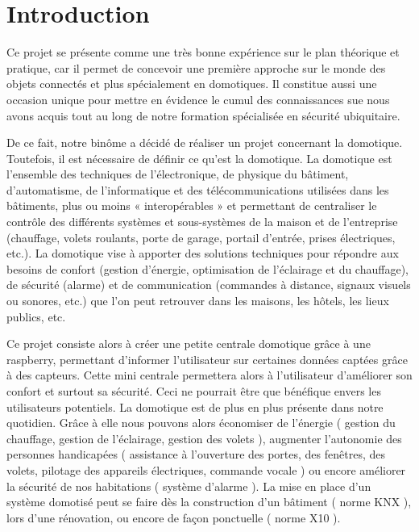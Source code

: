 
\chapter{Introduction}

Ce projet se présente comme une très bonne expérience sur le plan théorique et pratique, car il permet de concevoir une première approche sur le monde des objets connectés et plus spécialement en domotiques. Il constitue aussi une occasion unique pour mettre en évidence le cumul des connaissances sue nous avons acquis tout au long de notre formation spécialisée en sécurité ubiquitaire.


De ce fait, notre binôme a décidé de réaliser un projet concernant la domotique. Toutefois, il est nécessaire de définir ce qu'est la domotique. La domotique est l'ensemble des techniques de l'électronique, de physique du bâtiment, d'automatisme, de l'informatique et des télécommunications utilisées dans les bâtiments, plus ou moins « interopérables » et permettant de centraliser le contrôle des différents systèmes et sous-systèmes de la maison et de l'entreprise (chauffage, volets roulants, porte de garage, 
portail d'entrée, prises électriques, etc.). La domotique vise à apporter des solutions techniques pour répondre aux besoins de 
confort (gestion d'énergie, optimisation de l'éclairage et du chauffage), de sécurité (alarme) et de communication (commandes à 
distance, signaux visuels ou sonores, etc.) que l'on peut retrouver dans les maisons, les hôtels, les lieux publics, etc.


Ce projet consiste alors à créer une petite centrale domotique grâce à une raspberry, permettant d'informer l'utilisateur sur certaines données captées grâce à des capteurs. Cette mini centrale permettera alors à l'utilisateur d'améliorer son confort et surtout sa sécurité. Ceci ne pourrait être que bénéfique envers les utilisateurs potentiels. La domotique est de plus en plus présente dans notre quotidien. Grâce à elle nous pouvons alors économiser de l'énergie ( gestion du chauffage, gestion de l'éclairage, gestion des volets ), augmenter l'autonomie des personnes handicapées ( assistance à l'ouverture des portes, des fenêtres, des volets, pilotage des appareils électriques, commande vocale ) ou encore améliorer la sécurité de nos habitations ( système d'alarme ). La mise en place d'un système domotisé peut se faire dès la construction d'un bâtiment ( norme KNX ), lors d'une rénovation, ou encore de façon ponctuelle ( norme X10 ).





